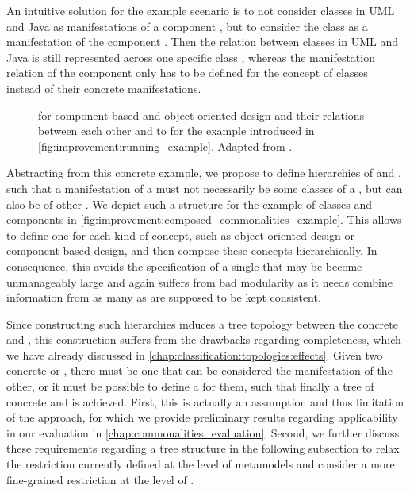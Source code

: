 An intuitive solution for the example scenario is to not consider classes in \gls{UML} and Java as manifestations of a component \commonality, but to consider the class \commonality as a manifestation of the component \commonality.
Then the relation between classes in \gls{UML} and Java is still represented across one specific class \commonality, whereas the manifestation relation of the component \commonality only has to be defined for the concept of classes instead of their concrete manifestations.

\begin{figure}
    \centering
    
    \caption[Hierarchic composition of \conceptmetamodels]{\Conceptmetamodels for component-based and object-oriented design and their relations between each other and to \concretemetamodels for the example introduced in \autoref{fig:improvement:running_example}. Adapted from .}
    \label{fig:improvement:composed_commonalities_example}
\end{figure}

Abstracting from this concrete example, we propose to define hierarchies of \commonalities and \conceptmetamodels, such that a manifestation of a \commonality must not necessarily be some classes of a \concretemetamodel, but can also be \commonalities of other \conceptmetamodels.
We depict such a structure for the example of classes and components in \autoref{fig:improvement:composed_commonalities_example}.
This allows to define one \conceptmetamodel for each kind of concept, such as object-oriented design or component-based design, and then compose these concepts hierarchically.
In consequence, this avoids the specification of a single \conceptmetamodel that may be become unmanageably large and again suffers from bad modularity as it needs combine information from as many \concretemetamodels as are supposed to be kept consistent.

Since constructing such hierarchies induces a tree topology between the concrete and \conceptmetamodels, this construction suffers from the drawbacks regarding completeness, which we have already discussed in \autoref{chap:classification:topologies:effects}.
Given two concrete or \conceptmetamodels, there must be one that can be considered the manifestation of the other, or it must be possible to define a \conceptmetamodel for them, such that finally a tree of concrete and \conceptmetamodels is achieved.
First, this is actually an assumption and thus limitation of the approach, for which we provide preliminary results regarding applicability in our evaluation in \autoref{chap:commonalities_evaluation}.
Second, we further discuss these requirements regarding a tree structure in the following subsection to relax the restriction currently defined at the level of metamodels and consider a more fine-grained restriction at the level of \metaclasses.


